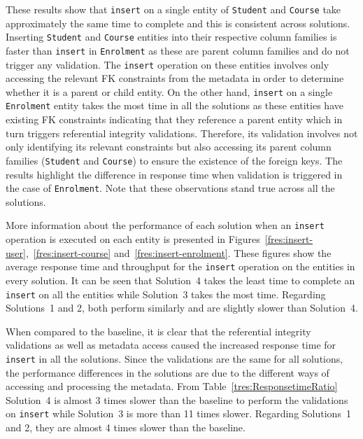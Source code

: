 These results show
that \texttt{insert} on a single entity of \texttt{Student} and \texttt{Course}
take approximately the same time to complete and this is consistent across
solutions. Inserting \texttt{Student} and \texttt{Course} entities into their
respective column families is faster than \texttt{insert} in \texttt{Enrolment}
as these are parent column families and do not trigger any validation.
The \texttt{insert} operation on these entities involves only accessing the
relevant \ac{FK} constraints from the metadata in order to determine whether it
is a parent or child entity. 
On the other hand, \texttt{insert} on a single \texttt{Enrolment} entity takes
the most time in all the solutions as these entities have existing \ac{FK}
constraints indicating that they reference a parent entity which in turn triggers
referential integrity validations. Therefore,  its validation involves not only
identifying its relevant constraints but also accessing its parent column
families (\texttt{Student} and \texttt{Course}) to ensure the existence of the
foreign keys.
The results highlight the difference in response time when validation is
triggered in the case of \texttt{Enrolment}.
Note that these observations stand true across all the solutions.

More information about the performance of each solution when an \texttt{insert}
operation is executed on each entity is presented in
Figures~\ref{fres:insert-user},~\ref{fres:insert-course}
and~\ref{fres:insert-enrolment}.
These figures show the average response time and throughput for the
\texttt{insert} operation on  the  entities in every solution.
It can be seen that Solution~4 takes the least time to
complete an \texttt{insert} on all the entities while Solution~3 takes the most
time. Regarding Solutions~1 and 2, both perform similarly and are slightly
slower than Solution~4. 

When compared to the baseline, it is clear that the referential integrity
validations as well as metadata access caused the increased response time for
\texttt{insert} in all the solutions. Since the validations are the same for all
solutions, the performance differences in the solutions are due to the different
ways of accessing and processing the metadata. From Table~\ref{tres:ResponsetimeRatio}
Solution~4 is almost 3 times slower than the baseline to perform the
validations on \texttt{insert} while Solution~3 is more than 11 times
slower. Regarding  Solutions~1 and 2, they are almost 4 times slower than the
baseline.

